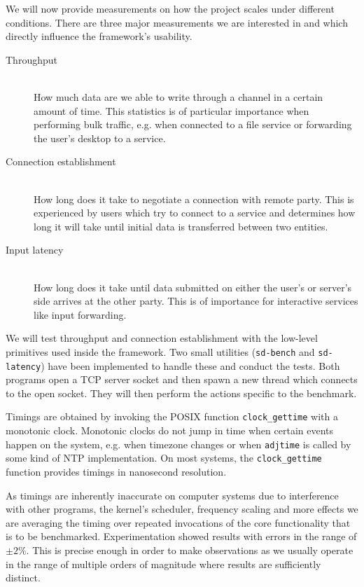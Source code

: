 We will now provide measurements on how the project scales under different conditions.
There are three major measurements we are interested in and which directly influence the framework's usability.
\begin{description}
    \item[Throughput]\hfill\\
        How much data are we able to write through a channel in a certain amount of time.
        This statistics is of particular importance when performing bulk traffic, e.g. when connected to a file service or forwarding the user's desktop to a service.
    \item[Connection establishment]\hfill\\
        How long does it take to negotiate a connection with remote party.
        This is experienced by users which try to connect to a service and determines how long it will take until initial data is transferred between two entities.
    \item[Input latency]\hfill\\
        How long does it take until data submitted on either the user's or server's side arrives at the other party.
        This is of importance for interactive services like input forwarding.
\end{description}

We will test throughput and connection establishment with the low-level primitives used inside the framework.
Two small utilities (\lstinline{sd-bench} and \lstinline{sd-latency}) have been implemented to handle these and conduct the tests.
Both programs open a TCP server socket and then spawn a new thread which connects to the open socket.
They will then perform the actions specific to the benchmark.

Timings are obtained by invoking the POSIX function \lstinline{clock_gettime} with a monotonic clock.
Monotonic clocks do not jump in time when certain events happen on the system, e.g. when timezone changes or when \lstinline{adjtime} is called by some kind of NTP implementation.
On most systems, the \lstinline{clock_gettime} function provides timings in nanosecond resolution.

As timings are inherently inaccurate on computer systems due to interference with other programs, the kernel's scheduler, frequency scaling and more effects we are averaging the timing over repeated invocations of the core functionality that is to be benchmarked.
Experimentation showed results with errors in the range of $\pm2\%$.
This is precise enough in order to make observations as we usually operate in the range of multiple orders of magnitude where results are sufficiently distinct.


